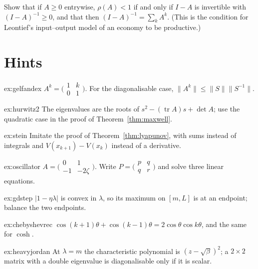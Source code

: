 \begin{exercise}[$\star\star\star$]\label{ex:leontief}
Show that if $A\ge0$ entrywise, $\rho(A)<1$ if and only if $I-A$ is invertible with $(I-A)^{-1}\ge0$, and that then $(I-A)^{-1}=\sum_kA^k$.
(This is the condition for Leontief's input--output model of an economy to be productive.)
\end{exercise}

\section{Hints}

\begin{hint}{ex:gelfandex}
$A^k=\bigl(\begin{smallmatrix}1&k\\0&1\end{smallmatrix}\bigr)$. For the diagonalisable case, $\|A^k\|\le\|S\|\|S^{-1}\|$.
\end{hint}
\begin{hint}{ex:hurwitz2}
The eigenvalues are the roots of $s^2-(\operatorname{tr}A)s+\det A$; use the quadratic case in the proof of Theorem~\ref{thm:maxwell}.
\end{hint}
\begin{hint}{ex:stein}
Imitate the proof of Theorem~\ref{thm:lyapunov}, with sums instead of integrals and $V(x_{k+1})-V(x_k)$ instead of a derivative.
\end{hint}
\begin{hint}{ex:oscillator}
$A=\bigl(\begin{smallmatrix}0&1\\-1&-2\zeta\end{smallmatrix}\bigr)$. Write $P=\bigl(\begin{smallmatrix}p&q\\q&r\end{smallmatrix}\bigr)$ and solve three
linear equations.
\end{hint}
\begin{hint}{ex:gdstep}
$|1-\eta\lambda|$ is convex in $\lambda$, so its maximum on $[m,L]$ is at an endpoint; balance the two endpoints.
\end{hint}
\begin{hint}{ex:chebyshevrec}
$\cos(k+1)\theta+\cos(k-1)\theta=2\cos\theta\cos k\theta$, and the same for $\cosh$.
\end{hint}
\begin{hint}{ex:heavyjordan}
At $\lambda=m$ the characteristic polynomial is $(z-\sqrt\beta)^2$; a $2\times2$ matrix with a double eigenvalue is diagonalisable only if it
is scalar.
\end{hint}
